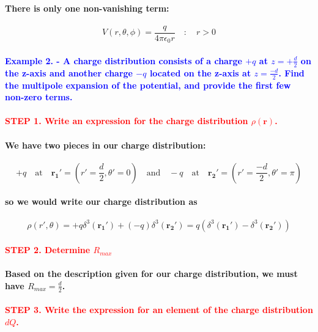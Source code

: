 \documentclass{article}
\begin{document}
\paragraph{\indent There is only one non-vanishing term:}
\begin{equation*}
    V(r,\theta,\phi)=\frac{q}{4\pi\epsilon_0r}\quad:\quad r>0
\end{equation*}
\paragraph{\textcolor{blue}{Example 2. - A charge distribution consists of a charge $+q$ at $z=+\frac{d}{2}$ on the z-axis and another charge $-q$ located on the z-axis at $z=\frac{-d}{2}$. Find the multipole expansion of the potential, and provide the first few non-zero terms.}}
\paragraph{\textcolor{red}{STEP 1. Write an expression for the charge distribution $\rho(\boldsymbol{r})$.}}
\paragraph{\indent We have two pieces in our charge distribution:}
\begin{equation*}
    +q\quad\text{at}\quad \boldsymbol{r_1}'=(r'=\frac{d}{2},\theta'=0) \quad\text{and}\quad -q \quad\text{at}\quad \boldsymbol{r_2}'=(r'=\frac{-d}{2},\theta'=\pi)
\end{equation*}
\paragraph{\indent so we would write our charge distribution as}
\begin{equation*}
    \rho(r',\theta)=+q\delta^3(\boldsymbol{r_1}')+(-q)\delta^3(\boldsymbol{r_2}')=q(\delta^3(\boldsymbol{r_1}')-\delta^3(\boldsymbol{r_2}'))
\end{equation*}
\paragraph{\textcolor{red}{STEP 2. Determine $R_{max}$}}
\paragraph{\indent Based on the description given for our charge distribution, we must have $R_{max}=\frac{d}{2}$.}
\paragraph{\textcolor{red}{STEP 3. Write the expression for an element of the charge distribution $dQ$.}}
\end{document}
